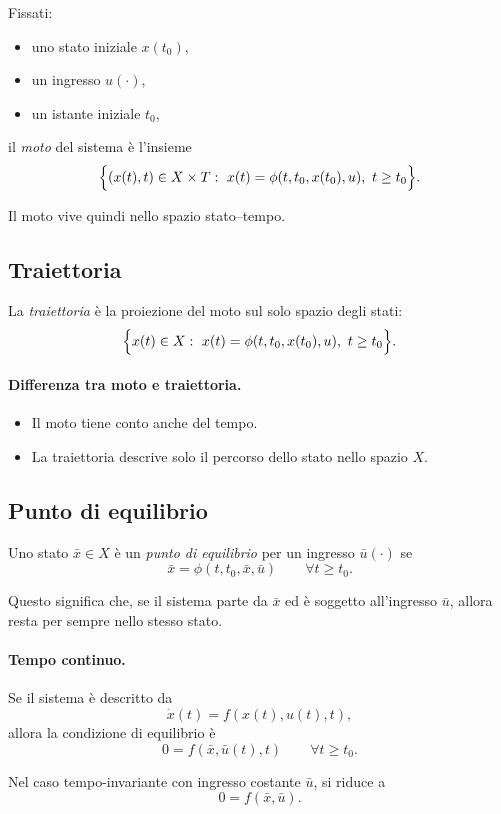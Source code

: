 Fissati:
\begin{itemize}
    \item uno stato iniziale $x(t_0)$,
    \item un ingresso $u(\cdot)$,
    \item un istante iniziale $t_0$,
\end{itemize}
il \emph{moto} del sistema è l'insieme
\[
\Bigl\{(x(t),t)\in X\times T:\ x(t)=\phi(t,t_0,x(t_0),u),\ t\ge t_0\Bigr\}.
\]

Il moto vive quindi nello spazio stato--tempo.

\subsection{Traiettoria}

La \emph{traiettoria} è la proiezione del moto sul solo spazio degli stati:
\[
\Bigl\{x(t)\in X:\ x(t)=\phi(t,t_0,x(t_0),u),\ t\ge t_0\Bigr\}.
\]

\paragraph{Differenza tra moto e traiettoria.}
\begin{itemize}
    \item Il moto tiene conto anche del tempo.
    \item La traiettoria descrive solo il percorso dello stato nello spazio $X$.
\end{itemize}

\subsection{Punto di equilibrio}

Uno stato $\bar x\in X$ è un \emph{punto di equilibrio} per un ingresso $\bar u(\cdot)$ se
\[
\bar x=\phi(t,t_0,\bar x,\bar u)\qquad \forall t\ge t_0.
\]

Questo significa che, se il sistema parte da $\bar x$ ed è soggetto all'ingresso $\bar u$, allora resta per sempre nello stesso stato.

\paragraph{Tempo continuo.}
Se il sistema è descritto da
\[
\dot x(t)=f(x(t),u(t),t),
\]
allora la condizione di equilibrio è
\[
0=f(\bar x,\bar u(t),t)\qquad \forall t\ge t_0.
\]

Nel caso tempo-invariante con ingresso costante $\bar u$, si riduce a
\[
0=f(\bar x,\bar u).
\]

